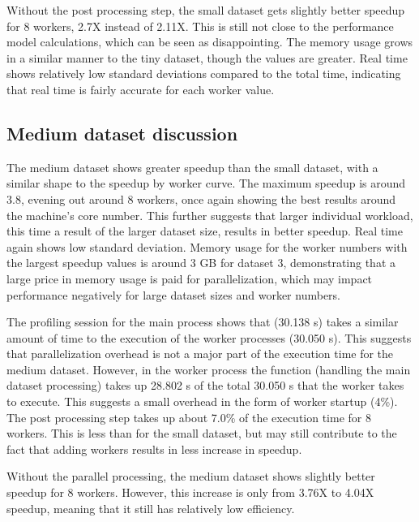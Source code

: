 Without the post processing step, the small dataset gets slightly better speedup for 8 workers, 2.7X instead of 2.11X. This is still not close to
the performance model calculations, which can be seen as disappointing. The memory usage grows in a similar manner to the tiny dataset, though the values are greater.
Real time shows relatively low standard deviations compared to the total time, indicating that real time is fairly accurate for each worker
value.

\subsection{Medium dataset discussion}
The medium dataset shows greater speedup than the small dataset, with a similar shape to the speedup by worker curve. The maximum speedup is
around 3.8, evening out around 8 workers, once again showing the best results around the machine's core number. This further suggests that larger
individual workload, this time a result of the larger dataset size, results in better speedup. Real time again shows
low standard deviation. Memory usage for the worker numbers with the largest speedup values is around 3 GB for dataset 3, demonstrating
that a large price in memory usage is paid for parallelization, which may impact performance negatively for large dataset sizes and
worker numbers.

The profiling session for the main process shows that  (30.138 s) takes a similar amount of time to the execution of
the worker processes (30.050 s). This suggests that parallelization overhead is not a major part of the execution time for the medium dataset.
However, in the worker process the  function (handling the main dataset processing) takes up 28.802 s of the total 30.050 s that the
worker takes to execute. This suggests a small overhead in the form of worker startup (4\%).
The post processing step takes up about 7.0\% of the execution time for 8 workers. This is less than for the small dataset, but may still contribute
to the fact that adding workers results in less increase in speedup.

Without the parallel processing, the medium dataset shows slightly better speedup for 8 workers. However, this increase is only from 3.76X to 4.04X
speedup, meaning that it still has relatively low efficiency.

